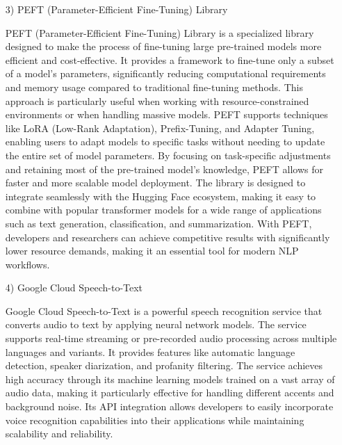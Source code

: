 \documentclass[conference]{IEEEtran}
\begin{document}
\begin{enumerate}
\begin{itemize}
        \item [3)] PEFT (Parameter-Efficient Fine-Tuning) Library\par
        \vspace{0.3em}
        PEFT (Parameter-Efficient Fine-Tuning) Library is a specialized library designed to make the process of fine-tuning large pre-trained models more efficient and cost-effective. It provides a framework to fine-tune only a subset of a model’s parameters, significantly reducing computational requirements and memory usage compared to traditional fine-tuning methods. This approach is particularly useful when working with resource-constrained environments or when handling massive models. PEFT supports techniques like LoRA (Low-Rank Adaptation), Prefix-Tuning, and Adapter Tuning, enabling users to adapt models to specific tasks without needing to update the entire set of model parameters. By focusing on task-specific adjustments and retaining most of the pre-trained model’s knowledge, PEFT allows for faster and more scalable model deployment. The library is designed to integrate seamlessly with the Hugging Face ecosystem, making it easy to combine with popular transformer models for a wide range of applications such as text generation, classification, and summarization. With PEFT, developers and researchers can achieve competitive results with significantly lower resource demands, making it an essential tool for modern NLP workflows.

        \vspace{1em}

        \item [4)] Google Cloud Speech-to-Text\par
        \vspace{0.3em}
        Google Cloud Speech-to-Text is a powerful speech recognition service that converts audio to text by applying neural network models. The service supports real-time streaming or pre-recorded audio processing across multiple languages and variants. It provides features like automatic language detection, speaker diarization, and profanity filtering. The service achieves high accuracy through its machine learning models trained on a vast array of audio data, making it particularly effective for handling different accents and background noise. Its API integration allows developers to easily incorporate voice recognition capabilities into their applications while maintaining scalability and reliability.

        \vspace{1em}


\end{itemize}
\end{enumerate}
\end{document}
